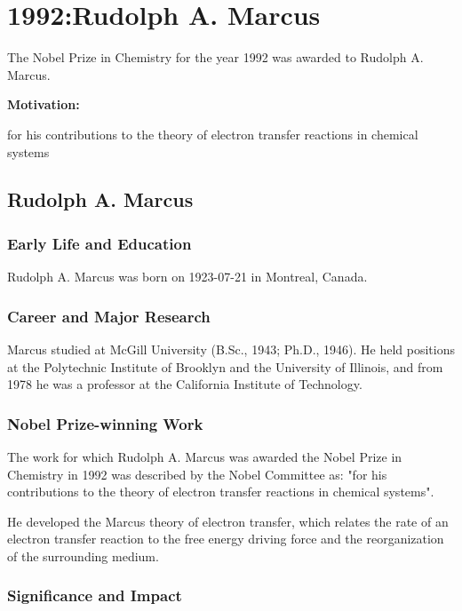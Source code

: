 \chapter{1992:Rudolph A. Marcus}

\label{chap:chemistry1992}

The Nobel Prize in Chemistry for the year 1992 was awarded to Rudolph A. Marcus.

\textbf{Motivation:}

for his contributions to the theory of electron transfer reactions in chemical systems

\section{Rudolph A. Marcus}

\subsection*{Early Life and Education}

Rudolph A. Marcus was born on 1923-07-21 in Montreal, Canada.

\subsection*{Career and Major Research}

Marcus studied at McGill University (B.Sc., 1943; Ph.D., 1946). He held positions at the Polytechnic Institute of Brooklyn and the University of Illinois, and from 1978 he was a professor at the California Institute of Technology.

\subsection*{Nobel Prize-winning Work}

The work for which Rudolph A. Marcus was awarded the Nobel Prize in Chemistry in 1992 was described by the Nobel Committee as: "for his contributions to the theory of electron transfer reactions in chemical systems".

He developed the Marcus theory of electron transfer, which relates the rate of an electron transfer reaction to the free energy driving force and the reorganization of the surrounding medium.

\subsection*{Significance and Impact}

